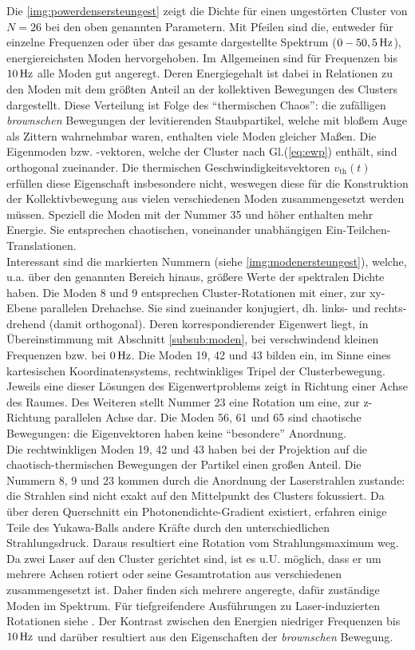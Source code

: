 \documentclass[numbers=noenddot,a4paper,notitlepage,twoside,BCOR15mm]{scrbook}
\newcommand{\ix}[1]{_\text{#1}}
\newcommand{\tilt}[1]{\textit{#1}}
\begin{document}
						Die \autoref{img:powerdensersteungest} zeigt die Dichte für einen ungestörten Cluster von $N=26$ bei den oben genannten Parametern. Mit Pfeilen sind die, entweder für einzelne Frequenzen oder über das gesamte dargestellte Spektrum ($\unit[0-50,5]{Hz}$), energiereichsten Moden hervorgehoben. Im Allgemeinen sind für Frequenzen bis $\unit[10]{Hz}$ alle Moden gut angeregt. Deren Energiegehalt ist dabei in Relationen zu den Moden mit dem größten Anteil an der kollektiven Bewegungen des Clusters dargestellt. Diese Verteilung ist Folge des "`thermischen Chaos"': die zufälligen \tilt{brownschen} Bewegungen der levitierenden Staubpartikel, welche mit bloßem Auge als Zittern wahrnehmbar waren, enthalten viele Moden gleicher Maßen. Die Eigenmoden bzw. -vektoren, welche der Cluster nach Gl.(\ref{eq:ewp}) enthält, sind orthogonal zueinander. Die  thermischen Geschwindigkeitsvektoren $v\ix{th}\left(t\right)$ erfüllen diese Eigenschaft insbesondere nicht, weswegen diese für die Konstruktion der Kollektivbewegung aus vielen verschiedenen Moden zusammengesetzt werden müssen. Speziell die Moden mit der Nummer 35 und höher enthalten mehr Energie. Sie entsprechen chaotischen, voneinander unabhängigen Ein-Teilchen-Translationen.\\
						Interessant sind die markierten Nummern (siehe \autoref{img:modenersteungest}), welche, u.a. über den genannten Bereich hinaus, größere Werte der spektralen Dichte haben. Die Moden 8 und 9 entsprechen Cluster-Rotationen mit einer, zur xy-Ebene parallelen  Drehachse. Sie sind zueinander konjugiert, dh. links- und rechts-drehend (damit orthogonal). Deren korrespondierender Eigenwert liegt, in Übereinstimmung mit Abschnitt \ref{subsub:moden}, bei verschwindend kleinen Frequenzen bzw. bei $\unit[0]{Hz}$. Die Moden 19, 42 und 43 bilden ein, im Sinne eines kartesischen Koordinatensystems, rechtwinkliges Tripel der Clusterbewegung. Jeweils eine dieser Lösungen des Eigenwertproblems zeigt in Richtung einer Achse des Raumes. Des Weiteren stellt Nummer 23 eine Rotation um eine, zur z-Richtung parallelen Achse dar. Die Moden 56, 61 und 65 sind chaotische Bewegungen: die Eigenvektoren haben keine "`besondere"' Anordnung.\\
						Die rechtwinkligen Moden 19, 42 und 43 haben bei der Projektion auf die chaotisch-thermischen Bewegungen der Partikel einen großen Anteil. Die Nummern 8, 9 und 23 kommen durch die Anordnung der Laserstrahlen zustande: die Strahlen sind nicht exakt auf den Mittelpunkt des Clusters fokussiert. Da über deren Querschnitt ein Photonendichte-Gradient existiert, erfahren einige Teile des Yukawa-Balls andere Kräfte durch den unterschiedlichen Strahlungsdruck. Daraus resultiert eine Rotation vom Strahlungsmaximum weg. Da zwei Laser auf den Cluster gerichtet sind, ist es u.U. möglich, dass er um mehrere Achsen rotiert oder seine Gesamtrotation aus verschiedenen zusammengesetzt ist. Daher finden sich mehrere angeregte, dafür zuständige Moden im Spektrum. Für tiefgreifendere Ausführungen zu Laser-induzierten Rotationen siehe \cite{Mulsow13}. Der Kontrast zwischen den Energien niedriger Frequenzen bis $\unit[10]{Hz}$ und darüber resultiert aus den Eigenschaften der \tilt{brownschen} Bewegung.
\end{document}
